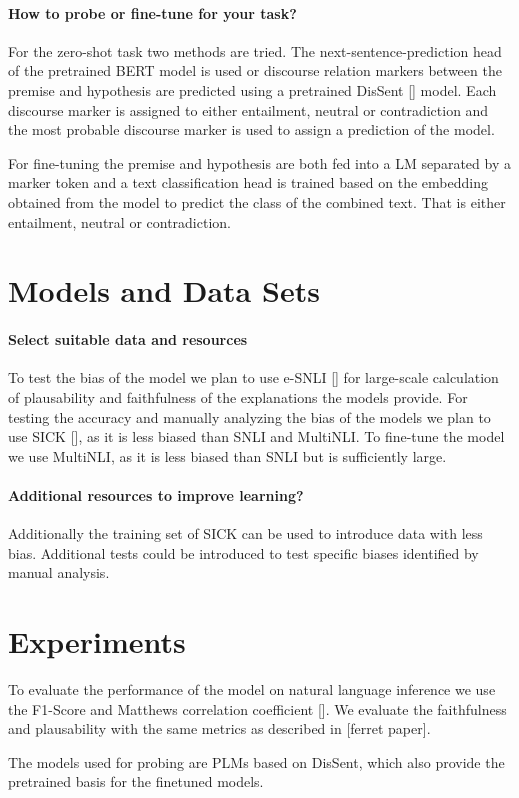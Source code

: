 \documentclass[12pt,a4paper]{article}
\begin{document}
\paragraph{How to probe or fine-tune for your task?}
For the zero-shot task two methods are tried. The next-sentence-prediction head of the pretrained BERT model is used or discourse relation markers between the premise and hypothesis are predicted using a pretrained DisSent [] model. Each discourse marker is assigned to either entailment, neutral or contradiction and the most probable discourse marker is used to assign a prediction of the model.

For fine-tuning the premise and hypothesis are both fed into a LM separated by a marker token and a text classification head is trained based on the embedding obtained from the model to predict the class of the combined text. That is either entailment, neutral or contradiction.

\section{Models and Data Sets}
\paragraph{Select suitable data and resources}
To test the bias of the model we plan to use e-SNLI [] for large-scale calculation of plausability and faithfulness of the explanations the models provide. For testing the accuracy and manually analyzing the bias of the models we plan to use SICK [], as it is less biased than SNLI and MultiNLI. To fine-tune the model we use MultiNLI, as it is less biased than SNLI but is sufficiently large.

\paragraph{Additional resources to improve learning?}
Additionally the training set of SICK can be used to introduce data with less bias. Additional tests could be introduced to test specific biases identified by manual analysis.

\section{Experiments}

To evaluate the performance of the model on natural language inference we use the F1-Score and Matthews correlation coefficient []. We evaluate the faithfulness and plausability with the same metrics as described in [ferret paper].

The models used for probing are PLMs based on DisSent, which also provide the pretrained basis for the finetuned models.
\end{document}

